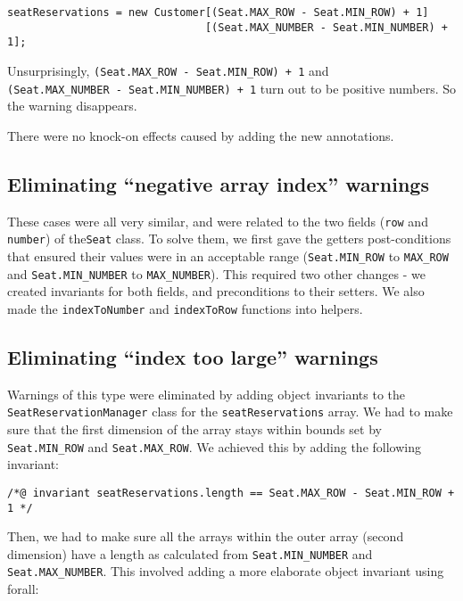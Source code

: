\documentclass[11pt]{article}
\begin{document}
\noindent
\begin{verbatim}
seatReservations = new Customer[(Seat.MAX_ROW - Seat.MIN_ROW) + 1]
                               [(Seat.MAX_NUMBER - Seat.MIN_NUMBER) + 1];
\end{verbatim}

Unsurprisingly, \verb|(Seat.MAX_ROW - Seat.MIN_ROW) + 1| and \\
\verb|(Seat.MAX_NUMBER - Seat.MIN_NUMBER) + 1| turn out to be positive numbers. So the warning disappears.

There were no knock-on effects caused by adding the new annotations.

\subsection{Eliminating ``negative array index'' warnings}

These cases were all very similar, and were related to the two fields (\verb|row| and \verb|number|) of the\verb|Seat| class. To solve them, we first gave the getters post-conditions that ensured their values were in an acceptable range (\verb|Seat.MIN_ROW| to \verb|MAX_ROW| and \verb|Seat.MIN_NUMBER| to \verb|MAX_NUMBER|). This required two other changes - we created invariants for both fields, and preconditions to their setters. We also made the \verb|indexToNumber| and \verb|indexToRow| functions into helpers.

\subsection{Eliminating ``index too large'' warnings}

Warnings of this type were eliminated by adding object invariants to the \\
\verb|SeatReservationManager| class for the \verb|seatReservations| array. We had to make sure that the first dimension of the array stays within bounds set by \verb|Seat.MIN_ROW| and \verb|Seat.MAX_ROW|. We achieved this by adding the following invariant:

\noindent
\begin{verbatim}
/*@ invariant seatReservations.length == Seat.MAX_ROW - Seat.MIN_ROW + 1 */
\end{verbatim}

Then, we had to make sure all the arrays within the outer array (second dimension) have a length as calculated from \verb|Seat.MIN_NUMBER| and \verb|Seat.MAX_NUMBER|. This involved adding a more elaborate object invariant using forall:
\end{document}
